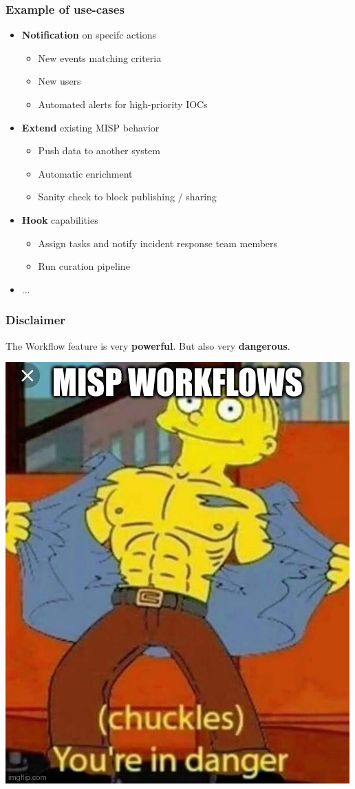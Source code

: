 \begin{frame}
    \frametitle{Example of use-cases}
    \begin{itemize}
        \item \textbf{Notification} on specifc actions
        \begin{itemize}
            \item New events matching criteria
            \item New users
            \item Automated alerts for high-priority IOCs
        \end{itemize}
        \item \textbf{Extend} existing MISP behavior
        \begin{itemize}
            \item Push data to another system
            \item Automatic enrichment
            \item Sanity check to block publishing / sharing
        \end{itemize}
        \item \textbf{Hook} capabilities
        \begin{itemize}
            \item Assign tasks and notify incident response team members
            \item Run curation pipeline
        \end{itemize}
        \item ...
    \end{itemize}
\end{frame}

\begin{frame}
    \frametitle{Disclaimer}
    The Workflow feature is very \textbf{powerful}. But also very \textbf{dangerous}.
    \begin{center}
        \includegraphics[width=0.55\linewidth]{pictures/youreindanger.jpg}
    \end{center}
\end{frame}

